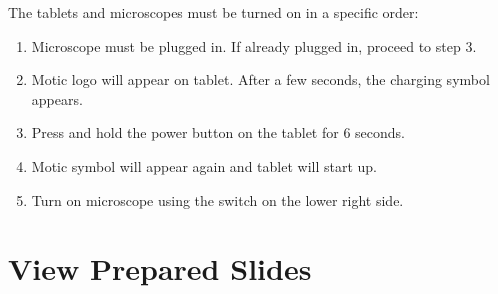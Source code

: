 The tablets and microscopes must be turned on in a specific order:

\begin{enumerate}
\def\labelenumi{\arabic{enumi}.}
\tightlist
\item
  Microscope must be plugged in. If already plugged in, proceed to step 3.
\item
  Motic logo will appear on tablet. After a few seconds, the charging symbol appears.
\item
  Press and hold the power button on the tablet for 6 seconds.
\item
  Motic symbol will appear again and tablet will start up.
\item
  Turn on microscope using the switch on the lower right side.
\end{enumerate}

\hypertarget{view-prepared-slides}{%
\section{View Prepared Slides}\label{view-prepared-slides}}

